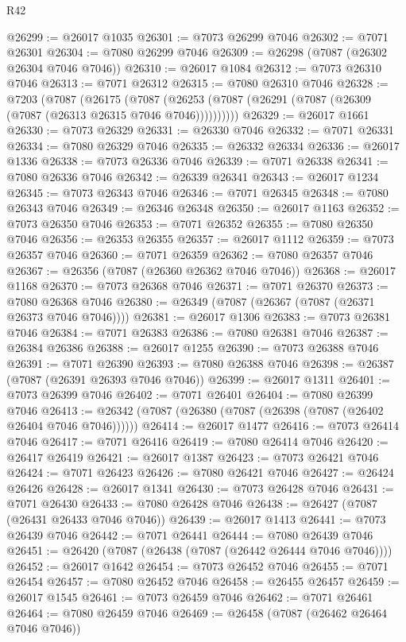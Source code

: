 \begin{lexlean}{R42}
\begin{coremodule}
{@26299 := @26017 @1035
@26301 := @7073 @26299 @7046
@26302 := @7071 @26301
@26304 := @7080 @26299 @7046
@26309 := @26298 (@7087 (@26302 @26304 @7046 @7046))
@26310 := @26017 @1084
@26312 := @7073 @26310 @7046
@26313 := @7071 @26312
@26315 := @7080 @26310 @7046
@26328 := @7203
    (@7087
      (@26175
        (@7087 (@26253 (@7087 (@26291 (@7087 (@26309 (@7087 (@26313 @26315 @7046 @7046))))))))))
@26329 := @26017 @1661
@26330 := @7073 @26329
@26331 := @26330 @7046
@26332 := @7071 @26331
@26334 := @7080 @26329 @7046
@26335 := @26332 @26334
@26336 := @26017 @1336
@26338 := @7073 @26336 @7046
@26339 := @7071 @26338
@26341 := @7080 @26336 @7046
@26342 := @26339 @26341
@26343 := @26017 @1234
@26345 := @7073 @26343 @7046
@26346 := @7071 @26345
@26348 := @7080 @26343 @7046
@26349 := @26346 @26348
@26350 := @26017 @1163
@26352 := @7073 @26350 @7046
@26353 := @7071 @26352
@26355 := @7080 @26350 @7046
@26356 := @26353 @26355
@26357 := @26017 @1112
@26359 := @7073 @26357 @7046
@26360 := @7071 @26359
@26362 := @7080 @26357 @7046
@26367 := @26356 (@7087 (@26360 @26362 @7046 @7046))
@26368 := @26017 @1168
@26370 := @7073 @26368 @7046
@26371 := @7071 @26370
@26373 := @7080 @26368 @7046
@26380 := @26349 (@7087 (@26367 (@7087 (@26371 @26373 @7046 @7046))))
@26381 := @26017 @1306
@26383 := @7073 @26381 @7046
@26384 := @7071 @26383
@26386 := @7080 @26381 @7046
@26387 := @26384 @26386
@26388 := @26017 @1255
@26390 := @7073 @26388 @7046
@26391 := @7071 @26390
@26393 := @7080 @26388 @7046
@26398 := @26387 (@7087 (@26391 @26393 @7046 @7046))
@26399 := @26017 @1311
@26401 := @7073 @26399 @7046
@26402 := @7071 @26401
@26404 := @7080 @26399 @7046
@26413 := @26342 (@7087 (@26380 (@7087 (@26398 (@7087 (@26402 @26404 @7046 @7046))))))
@26414 := @26017 @1477
@26416 := @7073 @26414 @7046
@26417 := @7071 @26416
@26419 := @7080 @26414 @7046
@26420 := @26417 @26419
@26421 := @26017 @1387
@26423 := @7073 @26421 @7046
@26424 := @7071 @26423
@26426 := @7080 @26421 @7046
@26427 := @26424 @26426
@26428 := @26017 @1341
@26430 := @7073 @26428 @7046
@26431 := @7071 @26430
@26433 := @7080 @26428 @7046
@26438 := @26427 (@7087 (@26431 @26433 @7046 @7046))
@26439 := @26017 @1413
@26441 := @7073 @26439 @7046
@26442 := @7071 @26441
@26444 := @7080 @26439 @7046
@26451 := @26420 (@7087 (@26438 (@7087 (@26442 @26444 @7046 @7046))))
@26452 := @26017 @1642
@26454 := @7073 @26452 @7046
@26455 := @7071 @26454
@26457 := @7080 @26452 @7046
@26458 := @26455 @26457
@26459 := @26017 @1545
@26461 := @7073 @26459 @7046
@26462 := @7071 @26461
@26464 := @7080 @26459 @7046
@26469 := @26458 (@7087 (@26462 @26464 @7046 @7046))
}
\end{coremodule}
\end{lexlean}
